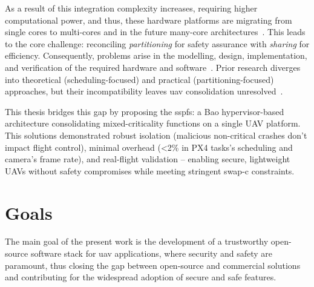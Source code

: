As a result of this integration
complexity increases, requiring higher computational power, and thus, these
hardware platforms are migrating from single cores to multi-cores and in the
future many-core architectures~\cite{burns2022mixed}.
This leads to the core challenge: reconciling \emph{partitioning} for safety
assurance with \emph{sharing} for efficiency.
Consequently, problems arise in the modelling, design, implementation, and
verification of the required hardware and software~\cite{burns2022mixed}.
Prior research diverges into theoretical (scheduling-focused) and practical (partitioning-focused) approaches, but their incompatibility leaves \gls{uav} consolidation unresolved~\cite{burns2022mixed}. 


This thesis bridges this gap by proposing the \gls{sspfs}: a Bao
hypervisor-based architecture consolidating mixed-criticality functions on a
single UAV platform. This solutions demonstrated robust isolation (malicious non-critical
crashes don't impact flight control), minimal overhead (<2\% in PX4 tasks's
scheduling and camera's frame rate), and real-flight validation -- enabling secure, lightweight UAVs without safety compromises while meeting stringent \gls{swap-c} constraints.

%

\section{Goals}
The main goal of the present work is the development of a trustworthy
open-source software stack for \gls{uav} applications, where security and safety
are paramount, thus closing the gap between open-source and commercial solutions
and contributing for the widespread adoption of secure and safe features.

